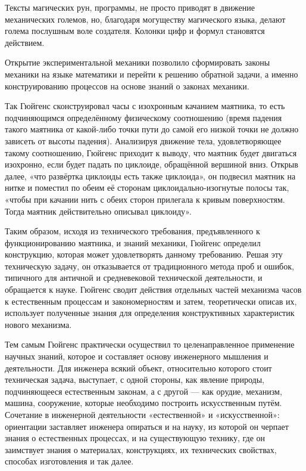 \documentclass[a4paper]{article}
\begin{document}
{Тексты магических рун, программы, не просто приводят в движение механических големов, но, благодаря могуществу магического языка, делают голема послушным воле создателя. Колонки цифр и формул становятся действием.

Открытие экспериментальной механики позволило сформировать законы механики на языке математики и перейти к решению обратной задачи, а именно конструированию процессов на основе знаний о законах механики.

Так Гюйгенс сконструировал часы с изохронным качанием маятника, то есть подчиняющимся определённому физическому соотношению (время падения такого маятника от какой-либо точки пути до самой его низкой точки не должно зависеть от высоты падения). Анализируя движение тела, удовлетворяющее такому соотношению, Гюйгенс приходит к выводу, что маятник будет двигаться изохронно, если будет падать по циклоиде, обращённой вершиной вниз. Открыв далее, «что развёртка циклоиды есть также циклоида», он подвесил маятник на нитке и поместил по обеим её сторонам циклоидально-изогнутые полосы так, «чтобы при качании нить с обеих сторон прилегала к кривым поверхностям. Тогда маятник действительно описывал циклоиду».

Таким образом, исходя из технического требования, предъявленного к функционированию маятника, и знаний механики, Гюйгенс определил конструкцию, которая может удовлетворять данному требованию. Решая эту техническую задачу, он отказывается от традиционного метода проб и ошибок, типичного для античной и средневековой технической деятельности, и обращается к науке. Гюйгенс сводит действия отдельных частей механизма часов к естественным процессам и закономерностям и затем, теоретически описав их, использует полученные знания для определения конструктивных характеристик нового механизма.

Тем самым Гюйгенс практически осуществил то целенаправленное применение научных знаний, которое и составляет основу инженерного мышления и деятельности. Для инженера всякий объект, относительно которого стоит техническая задача, выступает, с одной стороны, как явление природы, подчиняющееся естественным законам, а с другой — как орудие, механизм, машина, сооружение, которые необходимо построить искусственным путём. Сочетание в инженерной деятельности «естественной» и «искусственной»: ориентации заставляет инженера опираться и на науку, из которой он черпает знания о естественных процессах, и на существующую технику, где он заимствует знания о материалах, конструкциях, их технических свойствах, способах изготовления и так далее.

}
\end{document}
